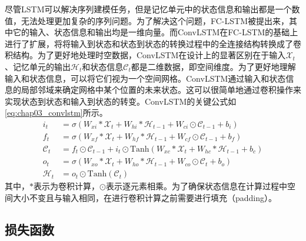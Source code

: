 尽管LSTM可以解决序列建模任务，但是记忆单元中的状态信息和输出都是一个数值，无法处理更加复杂的序列问题。为了解决这个问题，FC-LSTM\cite{graves2013generating}被提出来，其中它的输入、状态信息和输出均是一维向量。而ConvLSTM在FC-LSTM的基础上进行了扩展，将将输入到状态和状态到状态的转换过程中的全连接结构转换成了卷积结构。为了更好地处理时空数据，ConvLSTM在设计上的显著区别在于输入\(\mathcal{X}_t\)、记忆单元的输出\(\mathcal{H}_t\)和状态信息\(\mathcal{C}_t\)都是二维数据，即空间维度。为了更好地理解输入和状态信息，可以将它们视为一个空间网格。ConvLSTM通过输入和状态信息的局部邻域来确定网格中某个位置的未来状态。这可以很简单地通过卷积操作来实现状态到状态和输入到状态的转变。ConvLSTM的关键公式如\ref{eq:chap03_convlstm}所示。
\begin{equation}
  \begin{aligned}
    i_t           & = \sigma(W_{xi} \ast \mathcal{X}_t + W_{hi} \ast \mathcal{H}_{t-1} + W_{ci} \odot \mathcal{C}_{t-1} + b_i)          \\
    f_t           & = \sigma(W_{xf} \ast \mathcal{X}_t + W_{hf} \ast \mathcal{H}_{t-1} + W_{cf} \odot \mathcal{C}_{t-1} + b_f)          \\
    \mathcal{C}_t & = f_t \odot \mathcal{C}_{t-1} + i_t \odot \text{Tanh}(W_{xc} \ast \mathcal{X}_t + W_{hc} * \mathcal{H}_{t-1} + b_c) \\
    o_t           & = \sigma(W_{xo} \ast \mathcal{X}_t + W_{ho} \ast \mathcal{H}_{t-1} + W_{co} \odot \mathcal{C}_{t} + b_o)            \\
    \mathcal{H}_t & = o_t \odot \text{Tanh}(\mathcal{C}_t)
  \end{aligned}
  \label{eq:chap03_convlstm}
\end{equation}
其中，\(\ast\)表示为卷积计算，\(\odot\)表示逐元素相乘。为了确保状态信息在计算过程中空间大小不变且与输入相同，在进行卷积计算之前需要进行填充（padding）。

\subsection{损失函数}

